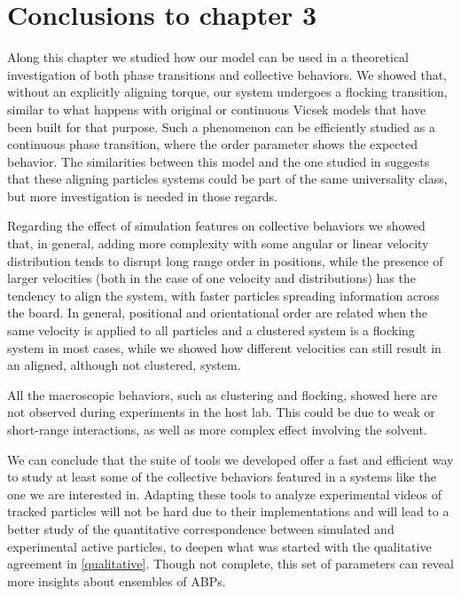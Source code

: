 \documentclass[../../master_thesis_np.tex]{subfiles}
\begin{document}
    \section{Conclusions to chapter 3}
    Along this chapter we studied how our model can be used in a theoretical investigation of both phase transitions and collective behaviors.
    We showed that, without an explicitly aligning torque, our system undergoes a flocking transition, similar to what happens with original or continuous Vicsek models that have been built for that purpose.
    Such a phenomenon can be efficiently studied as a continuous phase transition, where the order parameter shows the expected behavior.
    The similarities between this model and the one studied in \cite{martin-gomez_collective_2018} suggests that these aligning particles systems could be part of the same universality class, but more investigation is needed in those regards.
    
    Regarding the effect of simulation features on collective behaviors we showed that, in general, adding more complexity with some angular or linear velocity distribution tends to disrupt long range order in positions, while the presence of larger velocities (both in the case of one velocity and distributions) has the tendency to align the system, with faster particles spreading information across the board.
    In general, positional and orientational order are related when the same velocity is applied to all particles and a clustered system is a flocking system in most cases, while we showed how different velocities can still result in an aligned, although not clustered, system.
    
    All the macroscopic behaviors, such as clustering and flocking, showed here are not observed during experiments in the host lab.
    This could be due to weak or short-range interactions, as well as more complex effect involving the solvent.
    
    
    We can conclude that the suite of tools we developed offer a fast and efficient way to study at least some of the collective behaviors featured in a systems like the one we are interested in.
    Adapting these tools to analyze experimental videos of tracked particles will not be hard due to their implementations and will lead to a better study of the quantitative correspondence between simulated and experimental active particles, to deepen what was started with the qualitative agreement in \ref{qualitative}.
    Though not complete, this set of parameters can reveal more insights about ensembles of ABPs.

    
\end{document}
